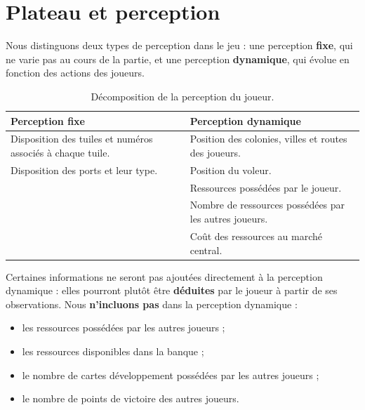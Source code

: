 \documentclass[11pt,a4paper]{article}
\begin{document}
\section{Plateau et perception}

Nous distinguons deux types de perception dans le jeu : une perception
\textbf{fixe}, qui ne varie pas au cours de la partie, et une perception
\textbf{dynamique}, qui évolue en fonction des actions des joueurs.

\begin{table}[h]
\centering
\renewcommand{\arraystretch}{1.3}
\begin{tabular}{>{\raggedright\arraybackslash}p{6.6cm} >{\raggedright\arraybackslash}p{6.6cm}}
\toprule
\textbf{\textcolor{accentdark}{Perception fixe}} &
\textbf{\textcolor{accentdark}{Perception dynamique}} \\
\midrule
Disposition des tuiles et numéros associés à chaque tuile. &
Position des colonies, villes et routes des joueurs. \\
Disposition des ports et leur type. &
Position du voleur. \\
 & Ressources possédées par le joueur. \\
 & Nombre de ressources possédées par les autres joueurs. \\
 & Coût des ressources au marché central. \\
\bottomrule
\end{tabular}
\caption{Décomposition de la perception du joueur.}
\end{table}

Certaines informations ne seront pas ajoutées directement à la perception dynamique :
elles pourront plutôt être \textbf{déduites} par le joueur à partir de ses
observations. Nous \textbf{n'incluons pas} dans la perception dynamique :

\begin{itemize}[nosep]
  \item les ressources possédées par les autres joueurs ;
  \item les ressources disponibles dans la banque ;
  \item le nombre de cartes développement possédées par les autres joueurs ;
  \item le nombre de points de victoire des autres joueurs.
\end{itemize}
\end{document}
